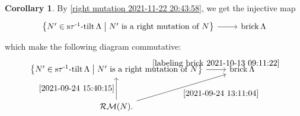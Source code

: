 \documentclass[pdftex,a4paper]{article}
\numberwithin{equation}{subsection}
\theoremstyle{definition}
\newtheorem{corollary}[theorem]{Corollary}
\newcommand{\setmid}{\; \middle|\;}
\newcommand{\stauitilt}{\operatorname{\mathrm{s\tau^{-1}-tilt}}}
\newcommand{\brick}{\operatorname{\mathrm{brick}}}
\begin{document}
\begin{corollary}
	By \cref{right mutation 2021-11-22 20:43:58}, we get the injective map
	\begin{equation}\label{labeling brick 2021-10-13 09:11:22}
		\begin{tikzcd}[row sep=1pt]
			\left\{ N'\in \stauitilt \Lambda \setmid \text{\(N'\) is a right mutation of \(N\)}\right\}\ar[r]&\brick \Lambda\\
		\end{tikzcd}
	\end{equation}
	which make the following diagram commutative:
	\begin{equation}
		\begin{tikzcd}[row sep=large]
			\left\{ N'\in \stauitilt \Lambda \setmid \text{\(N'\) is a right mutation of \(N\)} \right\}\ar[r,"\eqref{labeling brick 2021-10-13 09:11:22}"]&\brick \Lambda\\
			\mathcal{RM}(N)\ar[u,"\eqref{2021-09-24 15:40:15}"] \ar[ur,"\eqref{2021-09-24 13:11:04}"'].&
		\end{tikzcd}
	\end{equation}
\end{corollary}
\end{document}
